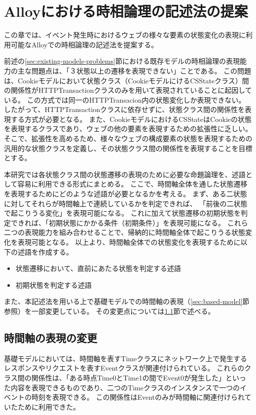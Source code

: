 \documentclass[journal]{IEEEtran}
\begin{document}
\section{Alloyにおける時相論理の記述法の提案}
\label{sec:ProposedModel-TemporalLogic}
この章では、イベント発生時におけるウェブの様々な要素の状態変化の表現に利用可能なAlloyでの時相論理の記述法を提案する。

前述の\ref{sec:existing-models-problems}節における既存モデルの時相論理の表現能力の主な問題点は、「３状態以上の遷移を表現できない」ことである。
この問題は、Cookieモデルにおいて状態クラス（CookieモデルにけるCSStateクラス）間の関係性がHTTPTransactionクラスのみを用いて表現されていることに起因している。
この方式では同一のHTTPTransacion内の状態変化しか表現できない。
したがって、HTTPTransactionクラスに依存せずに、状態クラス間の関係性を表現する方式が必要となる。
また、CookieモデルにおけるCSStateはCookieの状態を表現するクラスであり、ウェブの他の要素を表現するための拡張性に乏しい。
そこで、拡張性を高めるため、様々なウェブの構成要素の状態を表現するための汎用的な状態クラスを定義し、その状態クラス間の関係性を表現することを目標とする。

本研究では各状態クラス間の状態遷移の表現のために必要な命題論理を、述語として容易に利用できる形式にまとめる。
ここで、時間軸全体を通した状態遷移を表現するためにどのような述語が必要となるかを考える。
まず、ある二状態に対してそれらが時間軸上で連続しているかを判定できれば、
「前後の二状態で起こりうる変化」を表現可能になる。
これに加えて状態遷移の初期状態を判定できれば、「初期状態にかかる条件（初期条件）」を表現可能になる。
これら二つの表現能力を組み合わせることで、帰納的に時間軸全体で起こりうる状態変化を表現可能となる。
以上より、時間軸全体での状態変化を表現するために以下の述語を作成する。
\begin{itemize}
\item 状態遷移において、直前にあたる状態を判定する述語
\item 初期状態を判定する述語
\end{itemize}

また、本記述法を用いる上で基礎モデルでの時間軸の表現（\ref{sec:based-model}節参照）を一部変更している。
その変更点については\ref{sec:TimeClass}節で述べる。

\subsection{時間軸の表現の変更}
\label{sec:TimeClass}
基礎モデル\cite{based-model}においては、時間軸を表すTimeクラスにネットワーク上で発生するレスポンスやリクエストを表すEventクラスが関連付けられている。
これらのクラス間の関係性は、「ある時点Time0とTime1の間でEvent0が発生した」といった内容を表現できるものであり、二つのTimeクラスのインスタンスで一つのイベントの時刻を表現できる。
この関係性はEventのみが時間軸に関連付けられていたために利用できた。
\end{document}
